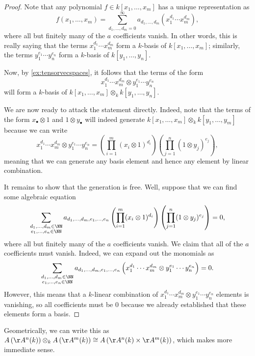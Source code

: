 \begin{proof}
	Note that any polynomial $f\in k[x_1,\ldots,x_m]$ has a unique representation as
	\[f(x_1,\ldots,x_m)=\sum_{d_1,\ldots,d_m=0}^\infty a_{d_1,\ldots,d_m}\left(x_1^{d_1}\cdots x_m^{d_m}\right),\]
	where all but finitely many of the $a$ coefficients vanish. In other words, this is really saying that the terms $x_1^{d_1}\cdots x_m^{d_m}$ form a $k$-basis of $k[x_1,\ldots,x_m]$; similarly, the terms $y_1^{e_1}\cdots y_n^{e_n}$ form a $k$-basis of $k[y_1,\ldots,y_n]$.

	Now, by \autoref{ex:tensorvecspaces}, it follows that the terms of the form
	\[x_1^{d_1}\cdots x_m^{d_m}\otimes y_1^{e_1}\cdots y_n^{e_n}\]
	will form a $k$-basis of $k[x_1,\ldots,x_m]\otimes_kk[y_1,\ldots,y_n]$.

	We are now ready to attack the statement directly. Indeed, note that the terms of the form $x_\bullet\otimes1$ and $1\otimes y_\bullet$ will indeed generate $k[x_1,\ldots,x_m]\otimes_kk[y_1,\ldots,y_m]$ because we can write
	\[x_1^{d_1}\cdots x_m^{d_m}\otimes y_1^{e_1}\cdots y_n^{e_n}=\left(\prod_{i=1}^m(x_i\otimes1)^{d_i}\right)\left(\prod_{j=1}^n(1\otimes y_j)^{e_j}\right),\]
	meaning that we can generate any basis element and hence any element by linear combination.

	It remains to show that the generation is free. Well, suppose that we can find some algebraic equation
	\[\sum_{\substack{d_1,\ldots,d_m\in\NN\\e_1,\ldots,e_n\in\NN}}a_{d_1,\ldots,d_m,e_1,\ldots,e_n}\left(\prod_{i=1}^m(x_i\otimes1)^{d_i}\right)\left(\prod_{j=1}^n(1\otimes y_j)^{e_j}\right)=0,\]
	where all but finitely many of the $a$ coefficients vanish. We claim that all of the $a$ coefficients must vanish. Indeed, we can expand out the monomials as
	\[\sum_{\substack{d_1,\ldots,d_m\in\NN\\e_1,\ldots,e_n\in\NN}}a_{d_1,\ldots,d_m,e_1,\ldots,e_n}\left(x_1^{d_1}\cdots x_m^{d_m}\otimes y_1^{e_1}\cdots y_n^{e_n}\right)=0.\]
	However, this means that a $k$-linear combination of $x_1^{d_1}\cdots x_m^{d_m}\otimes y_1^{e_1}\cdots y_n^{e_n}$ elements is vanishing, so all coefficients must be $0$ because we already established that these elements form a basis.
\end{proof}
\begin{remark}
	Geometrically, we can write this as $A\left(\AA^n(k)\right)\otimes_kA\left(\AA^m(k)\right)\cong A\left(\AA^n(k)\times\AA^m(k)\right)$, which makes more immediate sense.
\end{remark}
